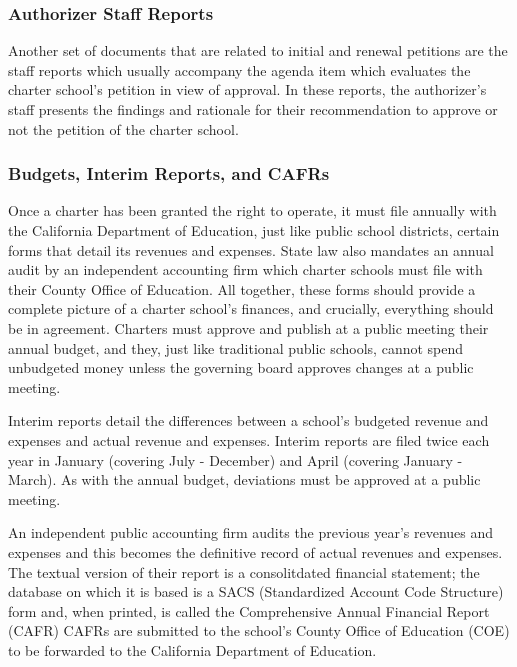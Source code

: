 \subsubsection{Authorizer Staff Reports}\label{sec:cs-staff-reports}\indent%

Another set of documents that are related to initial and renewal petitions are the staff reports which usually accompany the agenda item which evaluates the charter school's petition in view of approval. In these reports, the authorizer's staff presents the findings and rationale for their recommendation to approve or not the petition of the charter school.

\subsubsection{Budgets,  Interim Reports, and CAFRs}\label{sec:budgets-etc}\indent%

Once a charter has been granted the right to operate, it must file annually with the California Department of Education, just like public school districts, certain forms that detail its revenues and expenses. State law also mandates an annual audit by an independent accounting firm which charter schools must file with their County Office of Education. All together, these forms should provide a complete picture of a charter school's finances, and crucially, everything should be in agreement. Charters must approve and publish at a public meeting their annual budget, and they, just like traditional public schools, cannot spend unbudgeted money unless the governing board approves changes at a public meeting.

Interim reports detail the differences between a school's budgeted revenue and expenses and actual revenue and expenses. Interim reports are filed twice each year in January (covering July - December) and April (covering January - March). As with the annual budget, deviations must be approved at a public meeting.

An independent public accounting firm audits the previous year's revenues and expenses and this becomes the definitive record of actual revenues and expenses. The textual version of their report is a consolitdated financial statement; the database on which it is based is a SACS (Standardized Account Code Structure) form and, when printed, is called the Comprehensive Annual Financial Report (CAFR)  CAFRs are submitted to the school's County Office of Education (COE) to be forwarded to the California Department of Education. 

